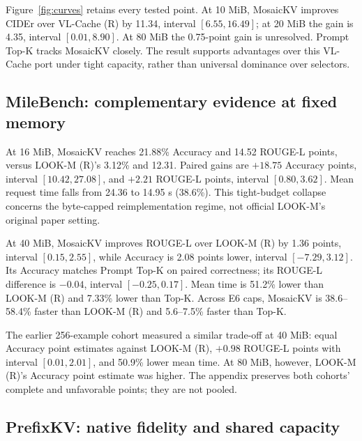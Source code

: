 Figure~\ref{fig:curves} retains every tested point. At 10 MiB, MosaicKV
improves CIDEr over VL-Cache (R) by 11.34, interval $[6.55,16.49]$;
at 20 MiB the gain is 4.35, interval $[0.01,8.90]$. At 80 MiB the
0.75-point gain is unresolved. Prompt Top-K tracks MosaicKV closely.
The result supports advantages over this VL-Cache port under tight capacity,
rather than universal dominance over selectors.

\subsection{MileBench: complementary evidence at fixed memory}
At 16 MiB, MosaicKV reaches 21.88\% Accuracy and 14.52 ROUGE-L points,
versus LOOK-M (R)'s 3.12\% and 12.31. Paired gains are $+18.75$ Accuracy
points, interval $[10.42,27.08]$, and $+2.21$ ROUGE-L points,
interval $[0.80,3.62]$. Mean request time falls from 24.36 to 14.95 s
(38.6\%). This tight-budget collapse concerns the byte-capped
reimplementation regime, not official LOOK-M's original paper setting.

\begin{table}[t]
\caption{MileBench E6 at 40 MiB initial / 71.5 MiB final and peak cache.
ROUGE-L is scaled by 100. Each metric covers its 96 applicable examples.}
\label{tab:mile40}
\centering\small\resizebox{\columnwidth}{!}{}
\end{table}

At 40 MiB, MosaicKV improves ROUGE-L over LOOK-M (R) by 1.36 points,
interval $[0.15,2.55]$, while Accuracy is 2.08 points lower,
interval $[-7.29,3.12]$. Its Accuracy matches Prompt Top-K on paired
correctness; its ROUGE-L difference is $-0.04$, interval $[-0.25,0.17]$.
Mean time is 51.2\% lower than LOOK-M (R) and 7.33\% lower than Top-K.
Across E6 caps, MosaicKV is 38.6--58.4\% faster than LOOK-M (R) and
5.6--7.5\% faster than Top-K.

The earlier 256-example cohort measured a similar trade-off at 40 MiB:
equal Accuracy point estimates against LOOK-M (R), $+0.98$ ROUGE-L points
with interval $[0.01,2.01]$, and 50.9\% lower mean time.
At 80 MiB, however, LOOK-M (R)'s Accuracy point estimate was higher.
The appendix preserves both cohorts' complete and unfavorable points;
they are not pooled.

\subsection{PrefixKV: native fidelity and shared capacity}
\begin{table}[t]
\caption{Completed PrefixKV native-retention lane, BF16, registered nominal
retention 0.5. R-L is FullKV-reference ROUGE-L scaled by 100; PPL is corpus
perplexity. Storage is MiB. Unequal realized bytes and decode maintenance make
this a native operating-point comparison, not an equal-budget policy comparison.}
\label{tab:prefixnative}
\centering\small
\end{table}

